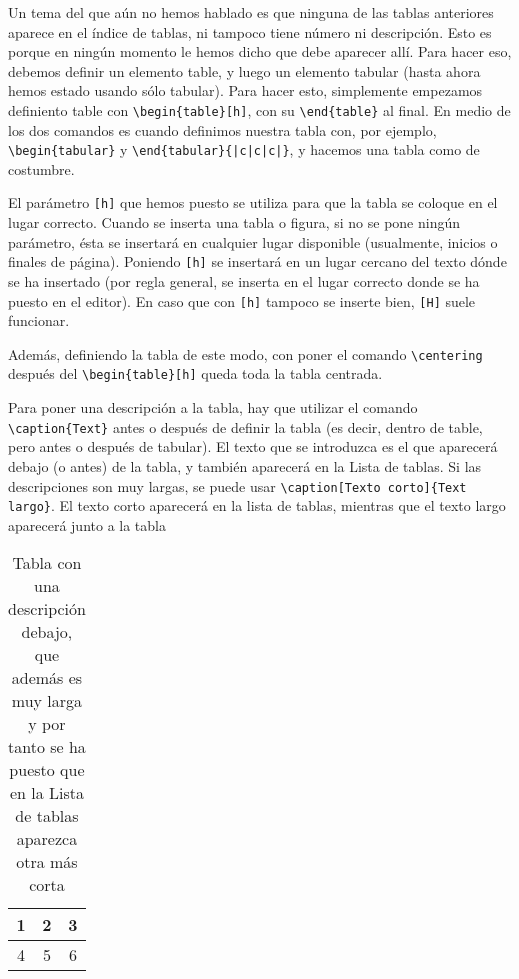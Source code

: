 Un tema del que aún no hemos hablado es que ninguna de las tablas anteriores aparece en el índice de tablas, ni tampoco tiene número ni descripción. Esto es porque en ningún momento le hemos dicho que debe aparecer allí. Para hacer eso, debemos definir un elemento table, y luego un elemento tabular (hasta ahora hemos estado usando sólo tabular). Para hacer esto, simplemente empezamos definiento table con \verb!\begin{table}[h]!, con su \verb!\end{table}! al final. En medio de los dos comandos es cuando definimos nuestra tabla con, por ejemplo, \verb!\begin{tabular}! y \verb!\end{tabular}{|c|c|c|}!, y hacemos una tabla como de costumbre.

El parámetro \verb![h]! que hemos puesto se utiliza para que la tabla se coloque en el lugar correcto. Cuando se inserta una tabla o figura, si no se pone ningún parámetro, ésta se insertará en cualquier lugar disponible (usualmente, inicios o finales de página). Poniendo \verb![h]! se insertará en un lugar cercano del texto dónde se ha insertado (por regla general, se inserta en el lugar correcto donde se ha puesto en el editor). En caso que con \verb![h]! tampoco se inserte bien, \verb![H]! suele funcionar.

Además, definiendo la tabla de este modo, con poner el comando \verb!\centering! después del \verb!\begin{table}[h]! queda toda la tabla centrada.

Para poner una descripción a la tabla, hay que utilizar el comando \verb!\caption{Text}! antes o después de definir la tabla (es decir, dentro de table, pero antes o después de tabular). El texto que se introduzca es el que aparecerá debajo (o antes) de la tabla, y también aparecerá en la Lista de tablas. Si las descripciones son muy largas, se puede usar \verb!\caption[Texto corto]{Text largo}!. El texto corto aparecerá en la lista de tablas, mientras que el texto largo aparecerá junto a la tabla

\begin{table}[h]
	\centering
	\begin{tabular}{|c|c|c|}
		\hline
		1 & 2 & 3 \\
		\hline
		4 & 5 & 6 \\
		\hline
	\end{tabular}
	\caption[Tabla con descripción]{Tabla con una descripción debajo, que además es muy larga y por tanto se ha puesto que en la Lista de tablas aparezca otra más corta}
	\label{table_1}
\end{table}

